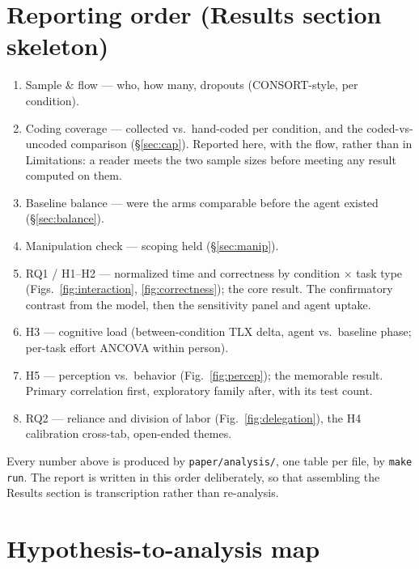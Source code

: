 \documentclass[11pt]{article}
\newcommand{\code}[1]{\texttt{#1}}
\begin{document}
\section{Reporting order (Results section skeleton)}

\begin{enumerate}[nosep]
  \item Sample \& flow --- who, how many, dropouts (CONSORT-style, per condition).
  \item Coding coverage --- collected vs.\ hand-coded per condition, and the coded-vs-uncoded comparison (\S\ref{sec:cap}). Reported here, with the flow, rather than in Limitations: a reader meets the two sample sizes before meeting any result computed on them.
  \item Baseline balance --- were the arms comparable before the agent existed (\S\ref{sec:balance}).
  \item Manipulation check --- scoping held (\S\ref{sec:manip}).
  \item RQ1 / H1--H2 --- normalized time and correctness by condition $\times$ task type (Figs.\ \ref{fig:interaction}, \ref{fig:correctness}); the core result. The confirmatory contrast from the model, then the sensitivity panel and agent uptake.
  \item H3 --- cognitive load (between-condition TLX delta, agent vs.\ baseline phase; per-task effort ANCOVA within person).
  \item H5 --- perception vs.\ behavior (Fig.\ \ref{fig:percep}); the memorable result. Primary correlation first, exploratory family after, with its test count.
  \item RQ2 --- reliance and division of labor (Fig.\ \ref{fig:delegation}), the H4 calibration cross-tab, open-ended themes.
\end{enumerate}

Every number above is produced by \code{paper/analysis/}, one table per file,
by \code{make run}. The report is written in this order deliberately, so that
assembling the Results section is transcription rather than re-analysis.

\section{Hypothesis-to-analysis map}
\end{document}
